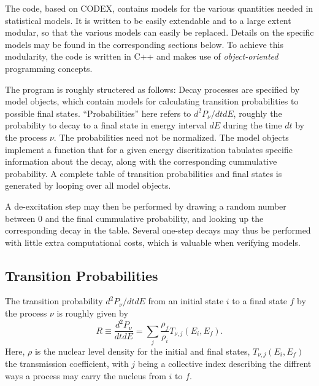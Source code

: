 The \codename{} code, based on CODEX\cite{gollerthan:1988:thesis}, contains models for the various quantities needed in statistical models. It is written to be easily extendable and to a large extent modular, so that the various models can easily be replaced. Details on the specific models may be found in the corresponding sections below.
To achieve this modularity, the code is written in C++ and makes use of \emph{object-oriented} programming concepts. 

The program is roughly structered as follows:
 Decay processes are specified by model objects, which contain models for calculating transition probabilities to possible final states. ``Probabilities'' here refers to $d^2 P_\nu/dtdE$, roughly the probability to decay to a final state in energy interval $dE$ during the time $dt$ by the process $\nu$. The probabilities need not be normalized.
The model objects implement a function that for a given energy discritization tabulates specific information about the decay, along with the corresponding cummulative probability. A complete table of transition probabilities and final states is generated by looping over all model objects.

 A de-excitation step may then be performed by drawing a random number between $0$ and the final cummulative probability, and looking up the corresponding decay in the table. Several one-step decays may thus be performed with little extra computational costs, which is valuable when verifying models.

\subsection{Transition Probabilities}
The transition probability $d^2 P_\nu/dtdE$ from an initial state $i$ to a final state $f$ by the process $\nu$ is roughly given by
\begin{equation}
R \equiv \frac{d^2 P_\nu}{dtdE} = \sum_j \frac{\rho_{f}}{\rho_i} T_{\nu,j}(E_i,E_f).
\end{equation}
Here, $\rho$ is the nuclear level density for the initial and final states, $T_{\nu,j}(E_i,E_f)$ the transmission coefficient, with $j$ being a collective index describing the diffrent ways a process may carry the nucleus from $i$ to $f$.